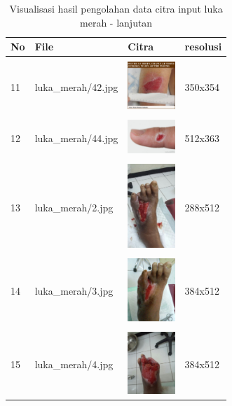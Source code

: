 \begin{table}[H]
	\centering
	\caption{Visualisasi hasil pengolahan data citra input luka merah - lanjutan}
	\label{tabel_input_9}
	\begin{tabular}{|m{0.2in}|m{1.2in}|m{0.7in}|m{0.7in}|}
		\hline
		\textbf{No} & \textbf{File} & \textbf{Citra} & \textbf{resolusi} \\
		\hline
		
		& &  &  \\
		11& 
		luka\_merah/42.jpg &
		\includegraphics[width=0.7in]{gambar/dataset_citra/luka_merah/42.jpg}&
		350x354\\
		\hline
		
		& &  &  \\
		12& 
		luka\_merah/44.jpg &
		\includegraphics[width=0.7in]{gambar/dataset_citra/luka_merah/44.jpg}&
		512x363\\
		\hline
		
		& &  &  \\
		13& 
		luka\_merah/2.jpg &
		\includegraphics[width=0.7in]{gambar/dataset_citra/luka_merah/2.jpg}&
		288x512\\
		\hline
		
		& &  &  \\
		14& 
		luka\_merah/3.jpg &
		\includegraphics[width=0.7in]{gambar/dataset_citra/luka_merah/3.jpg}&
		384x512\\
		\hline

		& &  &  \\
		15 & 
		luka\_merah/4.jpg &
		\includegraphics[width=0.7in]{gambar/dataset_citra/luka_merah/4.jpg}&
		384x512\\
		\hline
		

\end{tabular}
\end{table}
